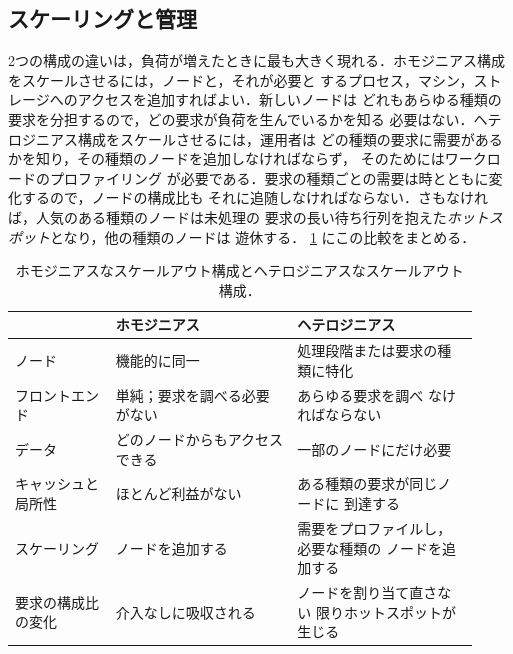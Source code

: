 \documentclass[../main.tex]{subfiles}
\begin{document}
\subsection{スケーリングと管理}

2つの構成の違いは，負荷が増えたときに最も大きく現れる．ホモジニアス構成をスケールさせるには，ノードと，それが必要と
するプロセス，マシン，ストレージへのアクセスを追加すればよい．新しいノードは
どれもあらゆる種類の要求を分担するので，どの要求が負荷を生んでいるかを知る
必要はない．ヘテロジニアス構成をスケールさせるには，運用者は
どの種類の要求に需要があるかを知り，その種類のノードを追加しなければならず，
そのためにはワークロードのプロファイリング
が必要である．要求の種類ごとの需要は時とともに変化するので，ノードの構成比も
それに追随しなければならない．さもなければ，人気のある種類のノードは未処理の
要求の長い待ち行列を抱えた\emph{ホットスポット}となり，他の種類のノードは
遊休する．%
\cref{tab:l16-arch} にこの比較をまとめる．

\begin{table}[htbp]
  \centering
  \caption{ホモジニアスなスケールアウト構成とヘテロジニアスなスケールアウト
    構成．}
  \label{tab:l16-arch}
  \small
  \begin{tabular}{@{}>{\raggedright\arraybackslash}p{0.2\linewidth}>{\raggedright\arraybackslash}p{0.36\linewidth}>{\raggedright\arraybackslash}p{0.36\linewidth}@{}}
    \toprule
    & ホモジニアス & ヘテロジニアス \\
    \midrule
    ノード & 機能的に同一 & 処理段階または要求の種類に特化 \\
    フロントエンド & 単純；要求を調べる必要がない & あらゆる要求を調べ
      なければならない \\
    データ & どのノードからもアクセスできる & 一部のノードにだけ必要 \\
    キャッシュと局所性 & ほとんど利益がない & ある種類の要求が同じノードに
      到達する \\
    スケーリング & ノードを追加する & 需要をプロファイルし，必要な種類の
      ノードを追加する \\
    要求の構成比の変化 & 介入なしに吸収される & ノードを割り当て直さない
      限りホットスポットが生じる \\
    \bottomrule
  \end{tabular}
\end{table}
\end{document}
